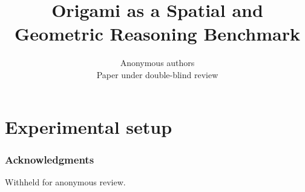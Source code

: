 \documentclass{article} %
\title{Origami as a Spatial and Geometric Reasoning Benchmark}
\author{Anonymous authors \\
Paper under double-blind review}
\newif\ifdraftnotes
\begin{document}
\maketitle







\section{Experimental setup}
\label{sec:experimental-setup}







\ifdraftnotes

\fi



\subsubsection*{Acknowledgments}

Withheld for anonymous review.




\appendix





\ifdraftnotes

% 
\fi
\end{document}
